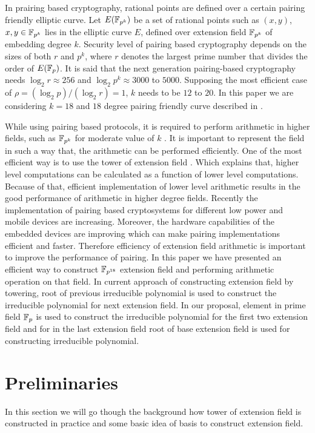 In prairing based cryptography, rational points are defined over a certain pairing friendly elliptic curve. Let $E(\mathbb{F}_{p^k})$ be a set of rational points such as $(x, y)$,  $x, y \in \mathbb{F}_{p^k}$ lies in the elliptic curve $E$, defined over extension field $\mathbb{F}_{p^k}$ of embedding degree $k$. Security level of pairing based cryptography depends on the sizes of both $r$ and $p^k$, where $r$ denotes the largest prime number that divides the order of $E(\mathbb{F}_p)$. It is said that the next generation pairing-based cryptography needs $\log_2 r \approx 256$ and $\log_2 p^k \approx 3000$ to $5000$. Supposing the most efficient case of $\rho = (\log_2 p)/(\log_2 r) = 1$, $k$ needs to be $12$ to $20$.  In this paper we are considering $k=18$ and $18$ degree pairing friendly curve described in \cite{EPRINT:FreScoTes06}. 

While using pairing based protocols, it is required to perform arithmetic in higher fields, such as $\mathbb{F}_{p^k}$  for moderate value of $k$ \cite{Silverman}. It is important to represent the field in such a way that, the arithmetic can be performed efficiently.  One of the most efficient way is to use the tower of extension field \cite{EPRINT:BenSco09}. Which explains that, higher level computations can be calculated as a function of lower level computations. Because of that, efficient implementation of lower level arithmetic results in the good performance of arithmetic in higher degree fields. Recently the implementation of pairing based cryptosystems for different low power and mobile devices are increasing. Moreover, the hardware capabilities of the embedded devices are improving which can make pairing implementations efficient and faster. Therefore efficiency of extension field arithmetic is important to improve the performance of pairing. In this paper we have presented an efficient way to construct $\mathbb{F}_{p^{18}}$  extension field and performing arithmetic operation on that field. In current approach of constructing extension field by towering, root of previous irreducible polynomial is used to construct the irreducible polynomial for next extension field. In our proposal, element in prime field $\mathbb{F}_p$ is used to construct the irreducible polynomial for the first two extension field and for in the last extension field root of base extension field is used for constructing irreducible polynomial.


\section{Preliminaries}
In this section we will go though the background how tower of extension field is constructed in practice and some basic idea of basis to construct extension field. 
